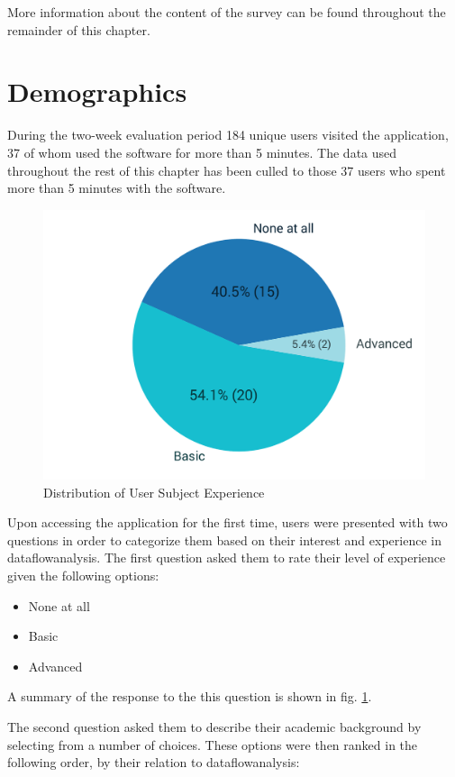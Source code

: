 \documentclass[bsc,twoside,singlespacing,parskip,logo,notimes,normalheadings]{infthesis}
\begin{document}
        More information about the content of the survey can be found
        throughout the remainder of this chapter.

    \section{Demographics}\label{sec:demographics}
    
    During the two-week evaluation period 184 unique users visited the
    application, 37 of whom used the software for more than 5
    minutes. The data used throughout the rest of this chapter has
    been culled to those 37 users who spent more than 5 minutes with
    the software.

    \begin{figure}
      \vspace{-12mm}
        \includegraphics[width=.40\textwidth, trim=150 0 100 0]{img/experience_pie.pdf}
        \captionsetup{width=.38\textwidth, justification=centering}
        \caption{Distribution of User Subject Experience}\label{fig:demo-q1}
    \end{figure}

    Upon accessing the application for the first time, users were
    presented with two questions in order to categorize them based on
    their interest and experience in \gls{dataflowanalysis}. The first
    question asked them to rate their level of experience given the
    following options:

    \begin{itemize}
    \item None at all
    \item Basic
    \item Advanced
    \end{itemize}

    A summary of the response to the this question is shown in
    fig. \ref{fig:demo-q1}.

    The second question asked them to describe their academic
    background by selecting from a number of choices. These options
    were then ranked in the following order, by their relation to
    \gls{dataflowanalysis}:
    
\end{document}
